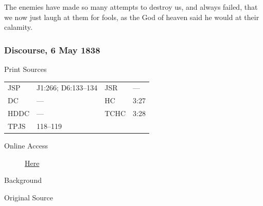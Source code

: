 					The enemies have made so many attempts to destroy us, and always failed, that we now just laugh at them for fools, as the God of heaven said he would at their calamity.
					
		\subsubsection{Discourse, 6 May 1838}
			\label{EMS-1838-JS-6-MAY-1838}
			
			\begin{description}
					\item[Print Sources]
				\end{description}

					\begin{tabular}{p{0.5in}p{1in}p{0.5in}p{1in}}
					JSP	 	& J1:266; D6:133--134		& JSR 		& --- \\
					DC	 	& ---		& HC 		& 3:27 \\
					HDDC 	& ---		& TCHC 		& 3:28 \\
					TPJS 	& 118--119	& 	 		&  \\ 
					\end{tabular}
				
				\begin{description}
					\item[Online Access] \href{https://www.josephsmithpapers.org/paper-summary/journal-march-september-1838/24}{Here}
				\end{description}
				
				\begin{description}
					\item[Background]
				\end{description}
				
				
				\begin{description}
					\item[Original Source]
				\end{description}
				
